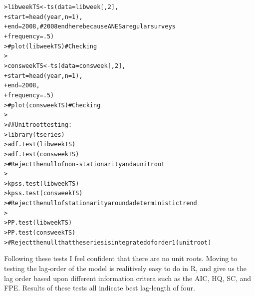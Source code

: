 \documentclass[12pt]{article}\usepackage[]{graphicx}\usepackage[]{color}
\makeatletter
\newcommand{\hlnum}[1]{\textcolor[rgb]{0.82,0.78,0.62}{#1}}%
\newcommand{\hlcom}[1]{\textcolor[rgb]{0.404,0.408,0.42}{#1}}%
\newcommand{\hlstd}[1]{\textcolor[rgb]{0.882,0.878,0.898}{#1}}%
\newcommand{\hlkwb}[1]{\textcolor[rgb]{0.902,0.675,0.196}{#1}}%
\newcommand{\hlkwc}[1]{\textcolor[rgb]{0.812,0.522,0.388}{#1}}%
\newcommand{\hlkwd}[1]{\textcolor[rgb]{0.733,0.388,0.812}{#1}}%
\newenvironment{kframe}{%
 \def\at@end@of@kframe{}%
 \ifinner\ifhmode%
  \def\at@end@of@kframe{\end{minipage}}%
  \begin{minipage}{\columnwidth}%
 \fi\fi%
 \def\FrameCommand##1{\hskip\@totalleftmargin \hskip-\fboxsep
 \colorbox{shadecolor}{##1}\hskip-\fboxsep
     \hskip-\linewidth \hskip-\@totalleftmargin \hskip\columnwidth}%
 \MakeFramed {\advance\hsize-\width
   \@totalleftmargin\z@ \linewidth\hsize
   \@setminipage}}%
 {\par\unskip\endMakeFramed%
 \at@end@of@kframe}
\newenvironment{knitrout}{}{} %
\makeatother
\begin{document}
\begin{flushleft}
\begin{knitrout}
\color{fgcolor}\begin{kframe}
\begin{alltt}
\hlstd{> }\hlstd{libweekTS} \hlkwb{<-} \hlkwd{ts}\hlstd{(}\hlkwc{data} \hlstd{= libweek[,}\hlnum{2}\hlstd{],}
\hlstd{+ }                \hlkwc{start} \hlstd{=} \hlkwd{head}\hlstd{(year,} \hlkwc{n} \hlstd{=} \hlnum{1}\hlstd{),}
\hlstd{+ }                \hlkwc{end} \hlstd{=} \hlnum{2008}\hlstd{,} \hlcom{# 2008 end here because ANES aregular surveys}
\hlstd{+ }                \hlkwc{frequency} \hlstd{=} \hlnum{.5}\hlstd{)}
\hlstd{> }\hlcom{# plot(libweekTS) # Checking}
\hlstd{> }
\hlstd{> }\hlstd{consweekTS} \hlkwb{<-} \hlkwd{ts}\hlstd{(}\hlkwc{data} \hlstd{= consweek[,}\hlnum{2}\hlstd{],}
\hlstd{+ }                \hlkwc{start} \hlstd{=} \hlkwd{head}\hlstd{(year,} \hlkwc{n} \hlstd{=} \hlnum{1}\hlstd{),}
\hlstd{+ }                \hlkwc{end} \hlstd{=} \hlnum{2008}\hlstd{,}
\hlstd{+ }                \hlkwc{frequency} \hlstd{=} \hlnum{.5}\hlstd{)}
\hlstd{> }\hlcom{# plot(consweekTS) # Checking}
\hlstd{> }
\hlstd{> }\hlcom{## Unit root testing:}
\hlstd{> }\hlkwd{library}\hlstd{(tseries)}
\hlstd{> } \hlkwd{adf.test}\hlstd{(libweekTS)}
\hlstd{> } \hlkwd{adf.test}\hlstd{(consweekTS)}
\hlstd{> }\hlcom{# Reject the null of non - stationarity and a unit root}
\hlstd{> }
\hlstd{> } \hlkwd{kpss.test}\hlstd{(libweekTS)}
\hlstd{> } \hlkwd{kpss.test}\hlstd{(consweekTS)}
\hlstd{> }\hlcom{# Reject the null of stationarity around a deterministic trend}
\hlstd{> }
\hlstd{> } \hlkwd{PP.test}\hlstd{(libweekTS)}
\hlstd{> } \hlkwd{PP.test}\hlstd{(consweekTS)}
\hlstd{> }\hlcom{# Reject the null that the series is integrated of order 1 (unit root)}
\end{alltt}
\end{kframe}
\end{knitrout}

Following these tests I feel confident that there are no unit roots. Moving to testing the lag-order of the model is realitively easy to do in R, and give us the lag order based upon different information critera such as the AIC, HQ, SC, and FPE. Results of these tests all indicate best lag-length of four.  


\end{flushleft}
\end{document}
